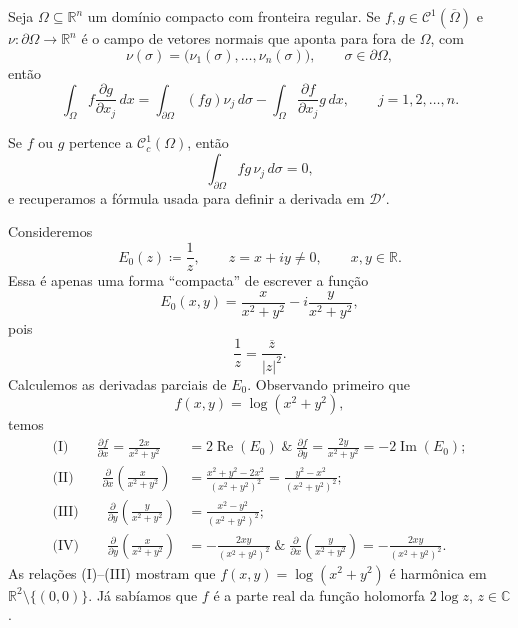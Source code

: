 \documentclass[../distribution_theory_notes.tex]{subfiles}
\begin{document}
\begin{lemma*}
	Seja \(\Omega\subseteq\mathbb{R}^{n}\) um domínio compacto com fronteira regular. Se \(f,g\in\mathcal{C}^{1}(\overline{\Omega})\) e \(\nu:\partial\Omega\to\mathbb{R}^{n}\) é o campo de vetores normais que aponta para fora de \(\Omega\), com
	\[
		\nu(\sigma)=\bigl(\nu_{1}(\sigma),\ldots,\nu_{n}(\sigma)\bigr),
		\qquad \sigma\in\partial\Omega,
	\]
	então
	\[
		\int_{\Omega}f\frac{\partial g}{\partial x_{j}}\,dx
		=
		\int_{\partial\Omega}(fg)\nu_{j}\,d\sigma
		-
		\int_{\Omega}\frac{\partial f}{\partial x_{j}}g\,dx,
		\qquad j=1,2,\ldots,n.
	\]
\end{lemma*}

\begin{tcolorbox}[
		skin=enhanced,
		title=Observação,
		fonttitle=\bfseries,
		colframe=black,
		colbacktitle=cyan!75!white,
		colback=cyan!15,
		colbacklower=black,
		coltitle=black,
		drop fuzzy shadow,
	]
	Se \(f\) ou \(g\) pertence a \(\mathcal{C}_{c}^{1}(\Omega)\), então
	\[
		\int_{\partial\Omega}fg\,\nu_{j}\,d\sigma=0,
	\]
	e recuperamos a fórmula usada para definir a derivada em \(\mathcal{D}'\).
\end{tcolorbox}

Consideremos
\[
	E_{0}(z)\coloneqq\frac{1}{z},
	\qquad z=x+iy\neq0,
	\qquad x,y\in\mathbb{R}.
\]
Essa é apenas uma forma ``compacta'' de escrever a função
\[
	E_{0}(x,y)
	=\frac{x}{x^{2}+y^{2}}-i\frac{y}{x^{2}+y^{2}},
\]
pois
\[
	\frac{1}{z}=\frac{\overline{z}}{|z|^{2}}.
\]
Calculemos as derivadas parciais de \(E_{0}\). Observando primeiro que
\[
	f(x,y)=\log(x^{2}+y^{2}),
\]
temos
\begin{align*}
	\text{(I)}\qquad \frac{\partial f}{\partial x}  =\frac{2x}{x^{2}+y^{2}} & =2\operatorname{Re}(E_{0}) \;\&\;\frac{\partial f}{\partial y} =\frac{2y}{x^{2}+y^{2}}=-2\operatorname{Im}(E_{0});                    \\[0.5em]
	\text{(II)}\qquad
	\frac{\partial}{\partial x}\left(\frac{x}{x^{2}+y^{2}}\right)
	                                                                        & =\frac{x^{2}+y^{2}-2x^{2}}{(x^{2}+y^{2})^{2}}
	=\frac{y^{2}-x^{2}}{(x^{2}+y^{2})^{2}};                                                                                                                                                                         \\[0.5em]
	\text{(III)}\qquad
	\frac{\partial}{\partial y}\left(\frac{y}{x^{2}+y^{2}}\right)
	                                                                        & =\frac{x^{2}-y^{2}}{(x^{2}+y^{2})^{2}};                                                                                               \\[0.5em]
	\text{(IV)}\qquad
	\frac{\partial}{\partial y}\left(\frac{x}{x^{2}+y^{2}}\right)
	                                                                        & =-\frac{2xy}{(x^{2}+y^{2})^{2}} \;\&\; \frac{\partial}{\partial x}\left(\frac{y}{x^{2}+y^{2}}\right) =-\frac{2xy}{(x^{2}+y^{2})^{2}}.
\end{align*}
As relações (I)--(III) mostram que \(f(x,y)=\log(x^{2}+y^{2})\) é harmônica em \(\mathbb{R}^{2}\setminus\{(0,0)\}\). Já sabíamos que \(f\) é a parte real da função holomorfa \(2\log z\), \(z\in\mathbb{C}\).
\end{document}
